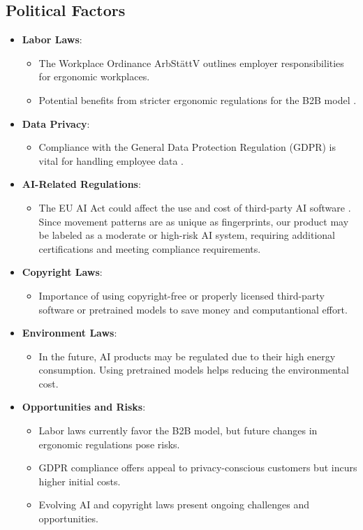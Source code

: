 \subsection{Political Factors}

\begin{itemize}
  \item \textbf{Labor Laws}:
  \begin{itemize}
    \item The Workplace Ordinance ArbStättV outlines employer responsibilities for ergonomic workplaces.
    \item Potential benefits from stricter ergonomic regulations for the B2B model \autocite{ArbStattV}.
  \end{itemize}

  \item \textbf{Data Privacy}:
  \begin{itemize}
    \item Compliance with the General Data Protection Regulation (GDPR) is vital for handling employee data \autocite{GDPR}.
  \end{itemize}

  \item \textbf{AI-Related Regulations}:
  \begin{itemize}
    \item The EU AI Act could affect the use and cost of third-party AI software \autocite{EUAIACT}. 
    Since movement patterns are as unique as fingerprints, our product may be labeled as a moderate or high-risk AI system, requiring additional certifications and meeting compliance requirements.
  \end{itemize}

  \item \textbf{Copyright Laws}:
  \begin{itemize}
    \item Importance of using copyright-free or properly licensed third-party software or pretrained models \autocite{CopyrightLaws} to save money and computantional effort. 
  \end{itemize}

  \item \textbf{Environment Laws}:
  \begin{itemize}
    \item In the future, AI products may be regulated due to their high energy consumption. Using pretrained models \autocite{CopyrightLaws} helps reducing the environmental cost.
  \end{itemize}

  \item \textbf{Opportunities and Risks}:
  \begin{itemize}
    \item Labor laws currently favor the B2B model, but future changes in ergonomic regulations pose risks.
    \item GDPR compliance offers appeal to privacy-conscious customers but incurs higher initial costs.
    \item Evolving AI and copyright laws present ongoing challenges and opportunities.
  \end{itemize}
\end{itemize}


